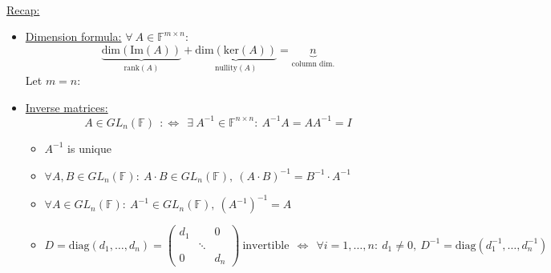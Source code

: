 \begin{frame}
	~\\
	{\blank	
		\underline{Recap:}
		\begin{itemize}\blank
			\item \underline{Dimension formula:} $\forall~A\in\mathbb{F}^{m\times n}$:
			$$
			\underbrace{\text{dim}(\text{Im}(A))}_{\text{rank}(A)} + \underbrace{\text{dim}(\text{ker}(A))}_{\text{nullity}(A)} =\underbrace{n}_{\text{column dim.}}
			$$
			Let $m=n$:
			\item \underline{Inverse matrices:}
			$$
			A\in GL_n(\mathbb{F})~~:\Leftrightarrow~~\exists~A^{-1}\in\mathbb{F}^{n\times n}:~A^{-1}A=AA^{-1}=I
			$$
			\begin{itemize}\blank
				\item $A^{-1}$ is unique
				\item $\forall A,B\in GL_n(\mathbb{F}):~A\cdot B\in GL_n(\mathbb{F}),~(A\cdot B)^{-1}=B^{-1}\cdot A^{-1}$
				\item $\forall A\in GL_n(\mathbb{F}):~A^{-1}\in GL_n(\mathbb{F}),~(A^{-1})^{-1}=A$
				\item $D=\text{diag}(d_1,\dots,d_n)=\begin{pmatrix}d_1&~&0\\~&\ddots&~\\0& &d_n\end{pmatrix}~\text{invertible}~~\Leftrightarrow~~\forall i=1,\dots,n:~d_1\neq 0,~D^{-1}=\text{diag}(d_1^{-1},\dots,d_n^{-1})$
			\end{itemize}
		\end{itemize}
	}
\end{frame}

